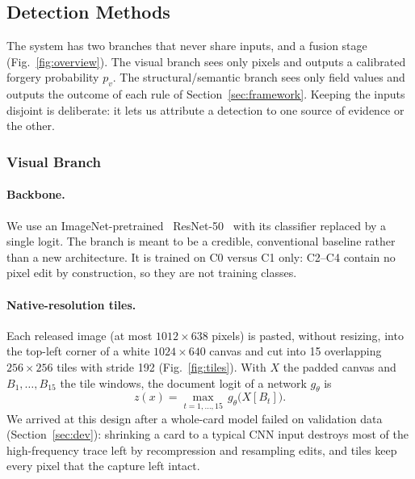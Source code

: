 \documentclass[12pt]{article}
\begin{document}
\subsection{Detection Methods}
\label{sec:method}

The system has two branches that never share inputs, and a fusion stage
(Fig.~\ref{fig:overview}). The visual branch sees only pixels and
outputs a calibrated forgery probability $p_v$. The
structural/semantic branch sees only field values and outputs the
outcome of each rule of Section~\ref{sec:framework}. Keeping the inputs
disjoint is deliberate: it lets us attribute a detection to one
source of evidence or the other.

\subsubsection{Visual Branch}
\label{sec:visual}

\paragraph*{Backbone.} We use an ImageNet-pretrained~\cite{imagenet}
ResNet-50~\cite{resnet} with its classifier replaced by a single logit.
The branch is meant to be a credible, conventional baseline rather than
a new architecture. It is trained on C0 versus C1 only: C2--C4 contain
no pixel edit by construction, so they are not training classes.

\paragraph*{Native-resolution tiles.} Each released image (at most
$1012{\times}638$ pixels) is pasted, without resizing, into the top-left
corner of a white $1024{\times}640$ canvas and cut into 15 overlapping
$256{\times}256$ tiles with stride 192 (Fig.~\ref{fig:tiles}). With
$X$ the padded canvas and $B_1,\dots,B_{15}$ the tile windows, the
document logit of a network $g_\theta$ is
\begin{equation}
\label{eq:maxtile}
z(x)=\max_{t=1,\dots,15}\, g_\theta\big(X[B_t]\big).
\end{equation}
We arrived at this design
after a whole-card model failed on validation data
(Section~\ref{sec:dev}): shrinking a card to a typical CNN input
destroys most of the high-frequency trace left by recompression and
resampling edits, and tiles keep every pixel that the capture left
intact.
\end{document}
